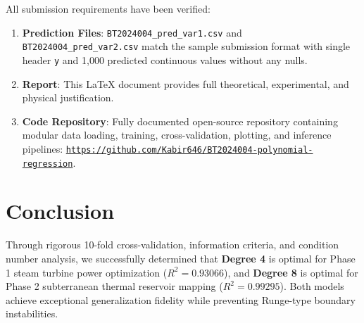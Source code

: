 \documentclass[10pt,twocolumn,a4paper]{article}
\begin{document}
\noindent All submission requirements have been verified:
\begin{enumerate}
    \item \textbf{Prediction Files}: \texttt{BT2024004\_pred\_var1.csv} and \texttt{BT2024004\_pred\_var2.csv} match the sample submission format with single header \texttt{y} and 1,000 predicted continuous values without any nulls.
    \item \textbf{Report}: This LaTeX document provides full theoretical, experimental, and physical justification.
    \item \textbf{Code Repository}: Fully documented open-source repository containing modular data loading, training, cross-validation, plotting, and inference pipelines: \href{https://github.com/Kabir646/BT2024004-polynomial-regression}{\texttt{https://github.com/Kabir646/BT2024004-polynomial-regression}}.
\end{enumerate}

\section{Conclusion}
Through rigorous 10-fold cross-validation, information criteria, and condition number analysis, we successfully determined that \textbf{Degree 4} is optimal for Phase 1 steam turbine power optimization ($R^2 = 0.93066$), and \textbf{Degree 8} is optimal for Phase 2 subterranean thermal reservoir mapping ($R^2 = 0.99295$). Both models achieve exceptional generalization fidelity while preventing Runge-type boundary instabilities.


\end{document}

